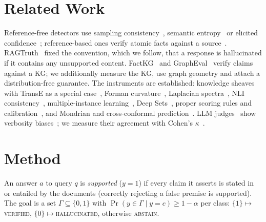 \documentclass[conference]{IEEEtran}
\begin{document}
\section{Related Work}
Reference-free detectors use sampling consistency~\cite{manakul2023selfcheckgpt}, semantic
entropy~\cite{farquhar2024semantic} or elicited confidence~\cite{kadavath2022know,tian2023just}; reference-based ones
verify atomic facts against a source~\cite{min2023factscore}. RAGTruth~\cite{niu2024ragtruth} fixed the convention, which
we follow, that a response is hallucinated if it contains any unsupported content. FactKG~\cite{kim2023factkg} and
GraphEval~\cite{sansford2024grapheval} verify claims against a KG; we additionally measure the KG, use graph geometry and
attach a distribution-free guarantee. The instruments are established: knowledge
sheaves~\cite{hansen2019sheaves,gebhart2023knowledge} with TransE as a special case~\cite{bordes2013transe}, Forman
curvature~\cite{forman2003bochner,samal2018comparative}, Laplacian spectra~\cite{chung1997spectral}, NLI
consistency~\cite{laban2022summac}, multiple-instance learning~\cite{dietterich1997mil,ilse2018attention}, Deep
Sets~\cite{zaheer2017deepsets}, proper scoring rules and calibration~\cite{gneiting2007scoring,platt1999probabilistic},
and Mondrian and cross-conformal prediction~\cite{vovk2012conditional,vovk2015cross,barber2021jackknife,angelopoulos2023gentle}.
LLM judges~\cite{zheng2023judging} show verbosity biases~\cite{dubois2024length}; we measure their agreement with Cohen's
$\kappa$~\cite{cohen1960kappa,landis1977measurement}.

\section{Method}
An answer $a$ to query $q$ is \emph{supported} ($y=1$) if every claim it asserts is stated in or entailed by the
documents (correctly rejecting a false premise is supported). The goal is a set $\Gamma\subseteq\{0,1\}$ with
$\Pr(y\in\Gamma\mid y=c)\ge1-\alpha$ per class: $\{1\}\mapsto$\textsc{verified}, $\{0\}\mapsto$\textsc{hallucinated},
otherwise \textsc{abstain}.
\end{document}
